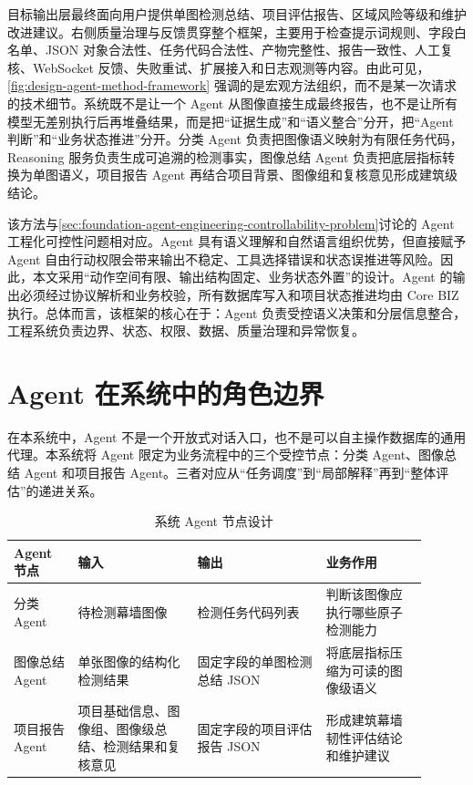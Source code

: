 目标输出层最终面向用户提供单图检测总结、项目评估报告、区域风险等级和维护改进建议。右侧质量治理与反馈贯穿整个框架，主要用于检查提示词规则、字段白名单、JSON 对象合法性、任务代码合法性、产物完整性、报告一致性、人工复核、WebSocket 反馈、失败重试、扩展接入和日志观测等内容。由此可见，\cref{fig:design-agent-method-framework} 强调的是宏观方法组织，而不是某一次请求的技术细节。系统既不是让一个 Agent 从图像直接生成最终报告，也不是让所有模型无差别执行后再堆叠结果，而是把“证据生成”和“语义整合”分开，把“Agent 判断”和“业务状态推进”分开。分类 Agent 负责把图像语义映射为有限任务代码，Reasoning 服务负责生成可追溯的检测事实，图像总结 Agent 负责把底层指标转换为单图语义，项目报告 Agent 再结合项目背景、图像组和复核意见形成建筑级结论。

该方法与\cref{sec:foundation-agent-engineering-controllability-problem}讨论的 Agent 工程化可控性问题相对应。Agent 具有语义理解和自然语言组织优势，但直接赋予 Agent 自由行动权限会带来输出不稳定、工具选择错误和状态误推进等风险。因此，本文采用“动作空间有限、输出结构固定、业务状态外置”的设计。Agent 的输出必须经过协议解析和业务校验，所有数据库写入和项目状态推进均由 Core BIZ 执行。总体而言，该框架的核心在于：Agent 负责受控语义决策和分层信息整合，工程系统负责边界、状态、权限、数据、质量治理和异常恢复。

\section{Agent 在系统中的角色边界}
\label{sec:design-agent-role-definition}

在本系统中，Agent 不是一个开放式对话入口，也不是可以自主操作数据库的通用代理。本系统将 Agent 限定为业务流程中的三个受控节点：分类 Agent、图像总结 Agent 和项目报告 Agent。三者对应从“任务调度”到“局部解释”再到“整体评估”的递进关系。

\begin{table}[!htb]
  \caption{系统 Agent 节点设计}\label{tab:agent-node-design}
  \centering
  \begin{tabular}{@{}p{0.14\linewidth}p{0.26\linewidth}p{0.28\linewidth}p{0.22\linewidth}@{}} \toprule
    \textbf{Agent 节点} & \textbf{输入} & \textbf{输出} & \textbf{业务作用} \\ \midrule
    分类 Agent & 待检测幕墙图像 & 检测任务代码列表 & 判断该图像应执行哪些原子检测能力 \\
    图像总结 Agent & 单张图像的结构化检测结果 & 固定字段的单图检测总结 JSON & 将底层指标压缩为可读的图像级语义 \\
    项目报告 Agent & 项目基础信息、图像组、图像级总结、检测结果和复核意见 & 固定字段的项目评估报告 JSON & 形成建筑幕墙韧性评估结论和维护建议 \\ \bottomrule
  \end{tabular}
\end{table}

